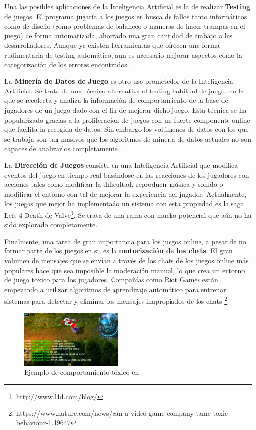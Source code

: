 Una las posibles aplicaciones de la Inteligencia Artificial es la de realizar \textbf{Testing} de juegos. El programa jugaría a los juegos en busca de fallos tanto informáticos como de diseño (como problemas de balanceo o maneras de hacer trampas en el juego) de forma automatizada, ahorrado una gran cantidad de trabajo a los desarrolladores. Aunque ya existen herramientas que ofrecen una forma rudimentaria de testing automático, aun es necesario mejorar aspectos como la categorización de los errores encontrados.

La \textbf{Minería de Datos de Juego} es otro uso prometedor de la Inteligencia Artificial. Se trata de una técnica alternativa al testing habitual de juegos en la que se recolecta y analiza la información de comportamiento de la base de jugadores de un juego dado con el fin de mejorar dicho juego\cite{ai_revisited}. Esta técnica se ha popularizado gracias a la proliferación de juegos con un fuerte componente online que facilita la recogida de datos. Sin embargo los volúmenes de datos con los que se trabaja son tan masivos que los algoritmos de mineria de datos actuales no son capaces de analizarlos completamente \cite{ai_revisited}.

La \textbf{Dirección de Juegos} consiste en una Inteligencia Artificial que modifica eventos del juego en tiempo real basándose en las reacciones de los jugadores con acciones tales como modificar la dificultad, reproducir música y sonido o modificar el entorno con tal de mejorar la experiencia del jugador. Actualmente, los juegos que mejor ha implementado un sistema con esta propiedad es la saga Left 4 Death de Valve\footnote{http://www.l4d.com/blog/}. Se trata de una rama con mucho potencial que aún no ha sido explorado completamente.

Finalmente, una tarea de gran importancia para los juegos online, a pesar de no formar parte de los juegos en si, es la \textbf{motorización de los chats}. El gran volumen de mensajes que se envían a través de los chats de los juegos online más populares hace que sea imposible la moderación manual, lo que crea un entorno de juego toxico para los jugadores. Compañías como Riot Games están empezando a utilizar algoritmos de aprendizaje automático para entrenar sistemas para detectar y eliminar los mensajes inapropiados de los chats \footnote{https://www.nature.com/news/can-a-video-game-company-tame-toxic-behaviour-1.19647}.

\begin{figure}[h]
	\includegraphics[width=0.45\textwidth]{images/estadodelarte/ai/lol-toxic-capture}
	\centering
	\caption{Ejemplo de comportamiento tóxico en .}
\end{figure}
